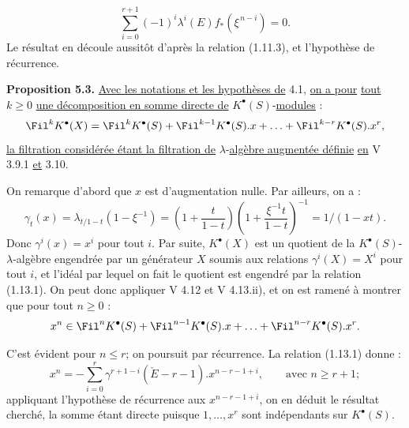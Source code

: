 
\[
  \sum_{i=0}^{r+1}(-1)^i\lambda^i(E)f_*(\xi^{\,n-i})=0 .
\]
Le
résultat en découle aussitôt d'après la relation (1.11.3), et l'hypothèse de récurrence.

\textbf{Proposition 5.3.} \uline{Avec les notations et les hypothèses de} 4.1, \uline{on a pour} \uline{tout} $k\ge 0$ \uline{une décomposition en somme directe de} $K^{\bullet}(S)$-\uline{modules} :
\begin{equation}\notag
  \Fil^kK^{\bullet}(X)=\Fil^kK^{\bullet}(S)+\Fil^{k-1}K^{\bullet}(S).x+\ldots+\Fil^{k-r}K^{\bullet}(S).x^r,
\end{equation}
\uline{la filtration considérée étant la filtration de} $\lambda$-\uline{algèbre augmentée définie} \uline{en} V 3.9.1 \uline{et} 3.10.

On remarque d'abord que $x$ est d'augmentation nulle. Par ailleurs, on a :
\[
  \gamma_t(x)=\lambda_{t/1-t}(1-\xi^{-1})
  =\left(1+\frac{t}{1-t}\right)\left(1+\frac{\xi^{-1}t}{1-t}\right)^{-1}
  =1/(1-xt) .
\]
Donc $\gamma^i(x)=x^i$ pour tout $i$. Par suite, $K^{\bullet}(X)$ est un quotient de la $K^{\bullet}(S)$-$\lambda$-algèbre engendrée par un générateur $X$ soumis aux relations $\gamma^i(X)=X^i$ pour tout $i$, et l'idéal par lequel on fait le quotient est engendré par la relation (1.13.1). On peut donc appliquer V 4.12 et V 4.13.ii), et on est ramené à montrer que pour tout $n\ge 0$ :
\[
  x^n\in \Fil^nK^{\bullet}(S)+\Fil^{n-1}K^{\bullet}(S).x+\ldots+\Fil^{n-r}K^{\bullet}(S).x^r .
\]

C'est évident pour $n\le r$; on poursuit par récurrence. La relation (1.13.1) donne :
\[
  x^n=-\sum_{i=0}^{r}\gamma^{r+1-i}(\check E-r-1).x^{n-r-1+i},\qquad \text{avec } n\ge r+1;
\]
appliquant l'hypothèse de récurrence aux $x^{n-r-1+i}$, on en déduit le résultat cherché, la somme étant directe puisque $1,\ldots,x^r$ sont indépendants sur $K^{\bullet}(S)$.

